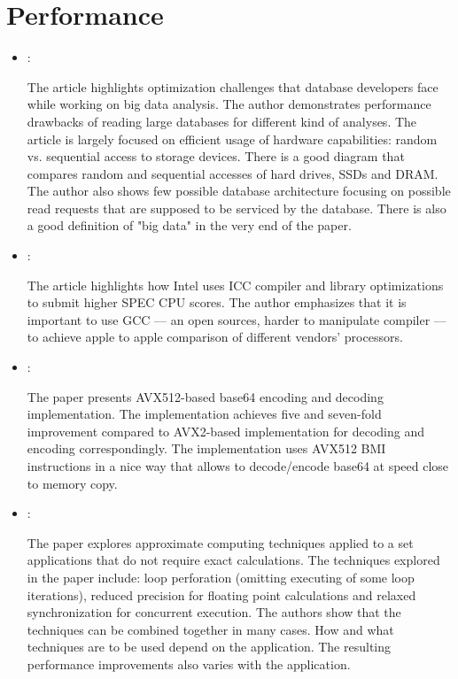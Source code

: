 \section*{Performance}
\begin{itemize}
    \item \cite{Jacobs:DataBasePerformance:2009}:

    The article highlights optimization challenges that database developers face while working on big data analysis. The author demonstrates performance drawbacks of reading large databases for different kind of analyses. The article is largely focused on efficient usage of hardware capabilities: random vs. sequential access to storage devices. There is a good diagram that compares random and sequential accesses of hard drives, SSDs and DRAM. The author also shows few possible database architecture focusing on possible read requests that are supposed to be serviced by the database. There is also a good definition of "big data" in the very end of the paper.

    \item \cite{Gwennap:IntelHidesBehindICC:2017}:

    The article highlights how Intel uses ICC compiler and library optimizations to submit higher SPEC CPU scores. The author emphasizes that it is important to use GCC --- an open sources, harder to manipulate compiler --- to achieve apple to apple comparison of different vendors' processors.

    \item \cite{Wojciech:Avx512Base64:2019}:

    The paper presents AVX512-based base64 encoding and decoding implementation. The implementation achieves five and seven-fold improvement compared to AVX2-based implementation for decoding and encoding correspondingly. The implementation uses AVX512 BMI instructions in a nice way that allows to decode/encode base64 at speed close to memory copy.

    \item \cite{Agrawal:ApproximateComputing:2016}:

    The paper explores approximate computing techniques applied to a set applications that do not require exact calculations. The techniques explored in the paper include: loop perforation (omitting executing of some loop iterations), reduced precision for floating point calculations and relaxed synchronization for concurrent execution. The authors show that the techniques can be combined together in many cases. How and what techniques are to be used depend on the application. The resulting performance improvements also varies with the application.
\end{itemize}

